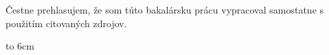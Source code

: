 \documentclass[12pt]{book}
\begin{document}
{~}\vspace{12cm}

\begin{minipage}{0.25\textwidth}~\end{minipage}
\begin{minipage}{0.69\textwidth}
Čestne prehlasujem, že som túto bakalársku prácu vypracoval samostatne
s použitím citovaných zdrojov.

\bigskip\bigskip

\hfill\hbox to 6cm{\dotfill}
\end{minipage}
\vfill\eject %

~\vfill\eject %

\tableofcontents


\mainmatter



\backmatter



\end{document}
